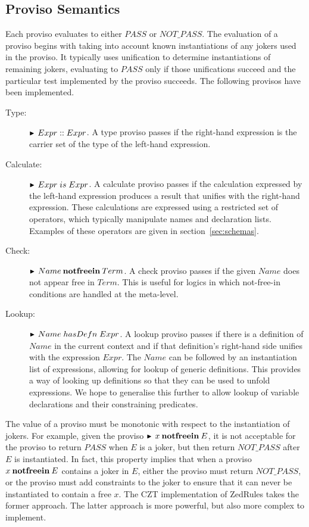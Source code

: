 \documentclass{entcs}
\newcommand{\hasDefn}{\mathrel{hasDefn}}
\newcommand{\is}{\mathrel{is}}
\begin{document}
\subsection{Proviso Semantics}

Each proviso evaluates to either $PASS$ or $NOT\_PASS$.  The
evaluation of a proviso begins with taking into account known
instantiations of any jokers used in the proviso.  It typically uses
unification to determine instantiations of remaining jokers,
evaluating to $PASS$ only if those unifications succeed and the
particular test implemented by the proviso succeeds.  The following
provisos have been implemented.

\begin{description}
\item[Type:] $\proviso Expr :: Expr$.
  A type proviso passes if the right-hand expression is the carrier
  set of the type of the left-hand expression.

\item[Calculate:] $\proviso Expr \is Expr$.
  A calculate proviso passes if the calculation expressed by the
  left-hand expression produces a result that unifies with the
  right-hand expression.  These calculations are expressed using a
  restricted set of operators, which typically manipulate names and
  declaration lists.  Examples of these operators are given in
  section~\ref{sec:schemas}.

\item[Check:] $\proviso Name \notfreein Term$.
  A check proviso passes if the given $Name$ does not appear free in
  $Term$.  This is useful for logics in which not-free-in conditions
  are handled at the meta-level.  
  
\item[Lookup:] $\proviso Name \hasDefn Expr$.  A lookup proviso passes if
  there is a definition of $Name$ in the current context and if that
  definition's right-hand side unifies with the expression $Expr$.  The
  $Name$ can be followed by an instantiation list of expressions, allowing
  for lookup of generic definitions.  This provides a way of looking up
  definitions so that they can be used to unfold expressions.  We hope to
  generalise this further to 
  allow lookup of variable declarations and their constraining predicates.

\end{description}

The value of a proviso must be monotonic with respect to the
instantiation of jokers.  For example, given the proviso $\proviso x
\notfreein E$, it is not acceptable for the proviso to return $PASS$
when $E$ is a joker, but then return $NOT\_PASS$ after $E$ is
instantiated.  In fact, this property implies that when a proviso $x
\mathbin{\mathop{\mathstrut{\mbox{\textbf{notfreein}}}}\nolimits} E$ contains a joker in $E$, either the proviso must return
$NOT\_PASS$, or the proviso must add constraints to the joker to
ensure that it can never be instantiated to contain a free $x$.  The
CZT implementation of ZedRules takes the former approach.  The latter
approach is more powerful, but also more complex to implement.
\end{document}
